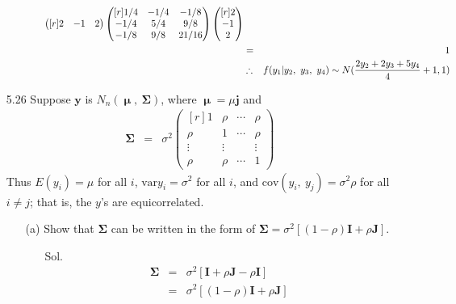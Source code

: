 \documentclass[12pt]{article} %
\begin{document}
\begin{enumerate}
\begin{enumerate}
\begin{enumerate}
\begin{eqnarray*}
\begin{pmatrix}[r]
						2 & -1 & 2					
					\end{pmatrix}
					\begin{pmatrix}[r]
						1/4 & -1/4 & -1/8 \\
					   -1/4 &  5/4 &  9/8 \\
					   -1/8 &  9/8 & 21/16 					
					\end{pmatrix} 					 					 
					\begin{pmatrix}[r]
						2 \\
					   -1 \\
					    2
					\end{pmatrix}\\ 					 					 
					&=& 1\\
					&\therefore& 
					f(y_{1}|y_{2},~y_{3},~y_{4}) \sim N\large ( \frac{2y_{2}+2y_{3}+5y_{4}}{4}+1, 1\large )			 		 					 
				\end{eqnarray*}
			\end{enumerate}
	\end{enumerate}
	\item[5.26] Suppose $\mathbf{y}$ is $N_{n}(\mathbf{\upmu,~\Sigma})$, where 
		$\mathbf{\upmu}=\mu\mathbf{j}$ and 
			\begin{eqnarray*}
				\mathbf{\Sigma}&=&
				\sigma^{2}
				\begin{pmatrix}[r]
					1    & \rho & \cdots & \rho \\
				\rho   &     1   & \cdots & \rho \\
				\vdots& \vdots & &\vdots\\
				\rho & \rho &\cdots& 1	
				\end{pmatrix}
			\end{eqnarray*}
		Thus $E(y_{i})=\mu$ for all $i$, $\mathrm{var}{y_{i}}=\sigma^{2}$ for all $i$, and
		 $\mathrm{cov}(y_{i},~y_{j})=\sigma^{2}\rho$ for all $i \neq j$; that is, the $y$'s are
		 equicorrelated.
		 \begin{enumerate}
		 	\item[(a)] Show that $\mathbf{\Sigma}$ can be written in the form of 
		 	$\mathbf{\Sigma}=\sigma^2[(1-\rho)\mathbf{I}+\rho\mathbf{J}]$.
		 	\begin{enumerate}
		 		\item[Sol.] 
		 		\begin{eqnarray*}
		 			\mathbf{\Sigma}&=&\sigma^{2}[\mathbf{I}+\rho\mathbf{J}-\rho\mathbf{I}]\\
		 								  &=&\sigma^{2}[(1-\rho)\mathbf{I}+\rho\mathbf{J}]
		 		\end{eqnarray*}
		 	\end{enumerate}

\end{enumerate}
\end{enumerate}
\end{document}
